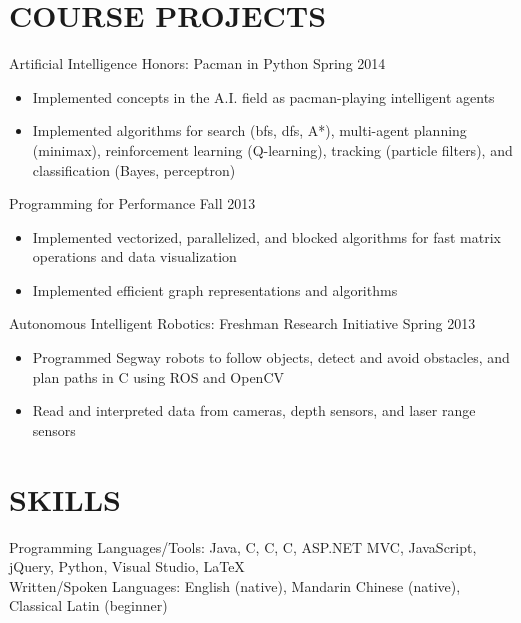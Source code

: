 \documentclass[margin]{res}
\newcommand{\PLUS}{\nolinebreak\hspace{-.05em}\raisebox{.4ex}{\tiny\bf+}}
\newcommand{\CC}{C\PLUS{}\PLUS{}}
\newcommand{\CS}{C\nolinebreak\hspace{-.05em}\raisebox{.4ex}{\scriptsize\bf \#}}
\begin{document}
\begin{resume}
\section{COURSE PROJECTS}

	Artificial Intelligence Honors: Pacman in Python \hfill Spring 2014
	\begin{itemize} \itemsep -2pt
	\item Implemented concepts in the A.I. field as pacman-playing intelligent agents
	\item Implemented algorithms for search (bfs, dfs, A*), multi-agent planning (minimax), reinforcement learning (Q-learning), tracking (particle filters), and classification (Bayes, perceptron)
	\end{itemize}

	Programming for Performance \hfill Fall 2013
	\begin{itemize} \itemsep -2pt
	\item Implemented vectorized, parallelized, and blocked algorithms for fast matrix operations and data visualization
	\item Implemented efficient graph representations and algorithms
	\end{itemize}

	Autonomous Intelligent Robotics: Freshman Research Initiative \hfill Spring 2013
	\begin{itemize} \itemsep -2pt
	\item Programmed Segway robots to follow objects, detect and avoid obstacles, and plan paths in \CC{} using ROS and OpenCV
	\item Read and interpreted data from cameras, depth sensors, and laser range sensors
	\end{itemize}

\section{SKILLS}
	Programming Languages/Tools: Java, C, \CC{}, \CS{}, ASP.NET MVC, JavaScript, jQuery, Python, Visual Studio, \LaTeX\\
	Written/Spoken Languages: English (native), Mandarin Chinese (native), Classical Latin (beginner)\\

\end{resume}
\end{document}
